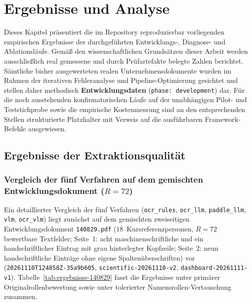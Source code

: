 \chapter{Ergebnisse und Analyse}
\label{chap:ergebnisse}

Dieses Kapitel präsentiert die im Repository reproduzierbar vorliegenden empirischen Ergebnisse der durchgeführten Entwicklungs-, Diagnose- und Ablationsläufe. Gemäß den wissenschaftlichen Grundsätzen dieser Arbeit werden ausschließlich real gemessene und durch Prüfartefakte belegte Zahlen berichtet. Sämtliche bisher ausgewerteten realen Unternehmensdokumente wurden im Rahmen der iterativen Fehleranalyse und Pipeline-Optimierung gesichtet und stellen daher methodisch \textbf{Entwicklungsdaten} (\texttt{phase: development}) dar. Für die noch ausstehenden konfirmatorischen Läufe auf der unabhängigen Pilot- und Teststichprobe sowie die empirische Kostenmessung sind an den entsprechenden Stellen strukturierte Platzhalter mit Verweis auf die ausführbaren Framework-Befehle ausgewiesen.

\section{Ergebnisse der Extraktionsqualität}
\label{sec:ergebnisse-qualitaet}

\subsection{Vergleich der fünf Verfahren auf dem gemischten Entwicklungsdokument (\texorpdfstring{$R = 72$}{R = 72})}
\label{subsec:ergebnisse-einzeldokument}

Ein detaillierter Vergleich der fünf Verfahren (\texttt{ocr\_rules}, \texttt{ocr\_llm}, \texttt{paddle\_llm}, \texttt{vlm}, \texttt{ocr\_vlm}) liegt zunächst auf dem gemischten zweiseitigen Entwicklungsdokument \texttt{140829.pdf} ($18$~Kursreferenzpersonen, $R = 72$ bewertbare Textfelder; Seite~1: acht maschinenschriftliche und ein handschriftlicher Eintrag mit grau hinterlegter Kopfzeile; Seite~2: neun handschriftliche Einträge ohne eigene Spaltenüberschriften) vor (\texttt{20261110T124858Z-35a9b605}, \texttt{scientific-20261110-v2}, \texttt{dashboard-20261111-v1}). Tabelle~\ref{tab:ergebnisse-140829} fasst die Ergebnisse unter primärer Originalrollenbewertung sowie unter tolerierter Namensrollen-Vertauschung zusammen.

